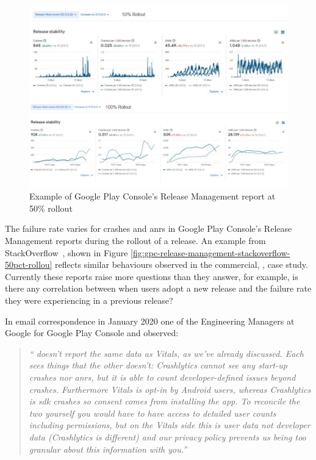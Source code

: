 \begin{figure}
    \centering
    \includegraphics{images/android-vitals-screenshots/stackoverflow/MSZVo-trimmed.pdf}
    \caption{Example of Google Play Console's Release Management report at 50\% rollout}
    \label{fig:gpc-release-management-stackoverflow-50pct-rollout}
\end{figure}

The failure rate varies for crashes and \Glspl{anr} in Google Play Console's Release Management reports during the rollout of a release. An example from StackOverflow~, shown in Figure \ref{fig:gpc-release-management-stackoverflow-50pct-rollou} reflects similar behaviours observed in the commercial, , case study. Currently these reports raise more questions than they answer, for example, is there any correlation between when users adopt a new release and the failure rate they were experiencing in a previous release?  

In email correspondence in January 2020 one of the Engineering Managers at Google for Google Play Console and  observed:

\begin{quote}
    \emph{`` doesn't report the same data as Vitals, as we've already discussed. Each sees things that the other doesn't: Crashlytics cannot see any start-up crashes nor \Glspl{anr}, but it is able to count developer-defined issues beyond crashes. Furthermore Vitals is opt-in by Android users, whereas Crashlytics is \Gls{sdk} crashes so consent comes from installing the app. To reconcile the two yourself you would have to have access to detailed user counts including permissions, but on the Vitals side this is user data not developer data (Crashlytics is different) and our privacy policy prevents us being too granular about this information with you.''}
\end{quote}

